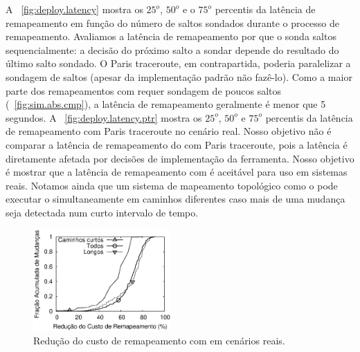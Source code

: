 A \figstr~\ref{fig:deploy.latency} mostra os $25^o$, $50^o$ e o $75^o$
percentis da latência de remapeamento em função do número de saltos
sondados durante o processo de remapeamento.  Avaliamos a latência de
remapeamento por que o \rmprt{} sonda saltos sequencialmente: a decisão
do próximo salto a sondar depende do resultado do último salto sondado.
O Paris traceroute, em contrapartida, poderia paralelizar a sondagem de
saltos (apesar da implementação padrão não fazê-lo).  Como a maior parte
dos remapeamentos com \rmprt{} requer sondagem de poucos saltos
(\figstr~\ref{fig:sim.abs.cmp}), a latência de remapeamento geralmente é
menor que 5 segundos.  A \figstr~\ref{fig:deploy.latency.ptr} mostra os
$25^o$, $50^o$ e $75^o$ percentis da latência de remapeamento com Paris
traceroute no cenário real.  Nosso objetivo não é comparar a latência de
remapeamento do \rmprt{} com Paris traceroute, pois a latência é
diretamente afetada por decisões de implementação da ferramenta.  Nosso
objetivo é mostrar que a latência de remapeamento com \rmprt{} é
aceitável para uso em sistemas reais.  Notamos ainda que um sistema de
mapeamento topológico como o \dtrack{} pode executar o \rmprt{}
simultaneamente em caminhos diferentes caso mais de uma mudança seja
detectada num curto intervalo de tempo.

\begin{figure}
\begin{center}
\includegraphics[width=0.47\textwidth]{figs/deploysavings.eps}
\caption{Redução do custo de remapeamento com \rmprt{} em cenários
reais.}
\label{fig:deploy.savings}
\end{center}
\end{figure}

